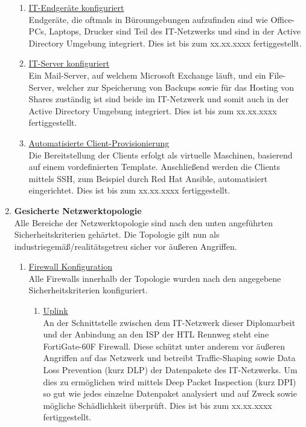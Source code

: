 \documentclass[
	headings=optiontotocandhead,%
	oneside,
	numbers=noenddot,%
	toc=flat, %
	10pt, %
	parskip=full, %
	listof=totoc, %
	listof=flat, %
	numbers=noenddot, %
	bibliography=totoc, %
	a4paper,DIV=14,
]{scrartcl}
\begin{document}
\begin{enumerate}[start=1,label={\bfseries Ziel-H \arabic*},leftmargin=*,wide]
\begin{enumerate}[label=\alph*.]
\item{\underline{IT-Endgeräte konfiguriert}}\\
Endgeräte, die oftmals in Büroumgebungen aufzufinden sind wie Office-PCs, Laptops, Drucker sind Teil des IT-Netzwerks und sind in der Active Directory Umgebung integriert. Dies ist bis zum xx.xx.xxxx fertiggestellt.

\item{\underline{IT-Server konfiguriert}}\\
Ein Mail-Server, auf welchem Microsoft Exchange läuft, und ein File-Server, welcher zur Speicherung von Backups sowie für das Hosting von Shares zuständig ist sind beide im IT-Netzwerk und somit auch in der Active Directory Umgebung integriert. Dies ist bis zum xx.xx.xxxx fertiggestellt.

\item{\underline{Automatisierte Client-Provisionierung}}\\
Die Bereitstellung der Clients erfolgt als virtuelle Maschinen, basierend auf einem vordefinierten Template. Anschließend werden die Clients mittels SSH, zum Beispiel durch Red Hat Ansible, automatisiert eingerichtet. Dies ist bis zum xx.xx.xxxx fertiggestellt.

\end{enumerate}
\item{\bfseries{Gesicherte Netzwerktopologie}}\\
Alle Bereiche der Netzwerktopologie sind nach den unten angeführten Sicherheitskriterien gehärtet. Die Topologie gilt nun als industriegemäß/realitätsgetreu sicher vor äußeren Angriffen.

\begin{enumerate}[label=\alph*.]
\item{\underline{Firewall Konfiguration}}\\
Alle Firewalls innerhalb der Topologie wurden nach den angegebene Sicherheitskriterien konfiguriert. 

\begin{enumerate}[label=\roman*.]
\item{\underline{Uplink}}\\
An der Schnittstelle zwischen dem IT-Netzwerk dieser Diplomarbeit und der Anbindung an den ISP der HTL Rennweg steht eine FortiGate-60F Firewall. Diese schützt unter anderem vor äußeren Angriffen auf das Netzwerk und betreibt Traffic-Shaping sowie Data Loss Prevention (kurz DLP) der Datenpakete des IT-Netzwerks. Um dies zu ermöglichen wird mittels Deep Packet Inspection (kurz DPI) so gut wie jedes einzelne Datenpaket analysiert und auf Zweck sowie mögliche Schädlichkeit überprüft. Dies ist bis zum xx.xx.xxxx fertiggestellt.


\end{enumerate}
\end{enumerate}
\end{enumerate}
\end{document}
